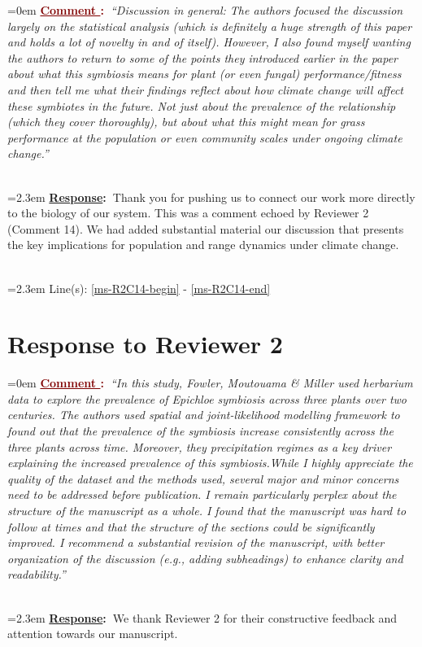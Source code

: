 \documentclass[12pt]{article}
\newcounter{cN}
\newcommand{\comment}[1]{
	\vspace{2em}
	\refstepcounter{cN} %
	\noindent \hangindent=0em \textbf{\textcolor{Maroon}{\uline{Comment \thecN}:~}}\emph{``#1''}
	}
\newcommand{\response}[1]{
	\\[0.25em]
	\hangindent=2.3em \textbf{\textcolor{NavyBlue}{\uline{Response}:~}}#1
	}
\newcommand{\linesref}[2]{
		\\[0.25em]
	\hangindent=2.3em {\color{Mahogany} Line(s): \ref{#1} - \ref{#2}}
}
\begin{document}
\comment{Discussion in general: The authors focused the discussion largely on the statistical analysis (which is definitely a huge strength of this paper and holds a lot of novelty in and of itself). However, I also found myself wanting the authors to return to some of the points they introduced earlier in the paper about what this symbiosis means for plant (or even fungal) performance/fitness and then tell me what their findings reflect about how climate change will affect these symbiotes in the future. Not just about the prevalence of the relationship (which they cover thoroughly), but about what this might mean for grass performance at the population or even community scales under ongoing climate change.}
\response{Thank you for pushing us to connect our work more directly to the biology of our system. This was a comment echoed by Reviewer 2 (Comment 14). We had added substantial material our discussion that presents the key implications for population and range dynamics under climate change.}
\linesref{ms-R2C14-begin}{ms-R2C14-end}





\section{Response to Reviewer 2}
\vspace{-2em}

\comment{In this study, Fowler, Moutouama \& Miller used herbarium data to explore the prevalence of Epichloe symbiosis across three plants over two centuries. The authors used spatial and joint-likelihood modelling framework to found out that the prevalence of the symbiosis increase consistently across the three plants across time. Moreover, they precipitation regimes as a key driver explaining the increased prevalence of this symbiosis.While I highly appreciate the quality of the dataset and the methods used, several major and minor concerns need to be addressed before publication. I remain particularly perplex about the structure of the manuscript as a whole. I found that the manuscript was hard to follow at times and that the structure of the sections could be significantly improved. I recommend a substantial revision of the manuscript, with better organization of the discussion (e.g., adding subheadings) to enhance clarity and readability.}
\response{We thank Reviewer 2 for their constructive feedback and attention towards our manuscript.}
\end{document}
